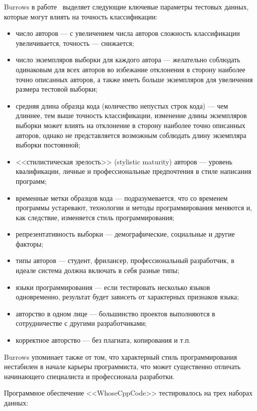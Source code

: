 Burrows в работе~\cite{burrows_big} выделяет следующие ключевые параметры тестовых данных,
которые могут влиять на точность классификации:

\begin{itemize}
 \item число авторов --- с увеличением числа авторов сложность классификации увеличивается, 
 точность --- снижается;
 \item число экземпляров выборки для каждого автора --- желательно соблюдать одинаковым для всех авторов во 
 избежание отклонения в сторону наиболее точно описанных авторов, а также иметь больше экземпляров 
 для увеличения размера тестовой выборки; 
 \item средняя длина образца кода (количество непустых строк кода) --- чем длиннее, тем выше точность
 классификации, изменение длины экземпляров выборки может влиять на отклонение в сторону наиболее 
 точно описанных авторов, однако не представляется возможным соблюдать длину экземпляра выборки постоянной;
 \item <<стилистическая зрелость>> (stylistic maturity) авторов --- уровень квалификации, 
 личные и профессиональные предпочтения в стиле написания программ;
 \item временные метки образцов кода --- подразумевается, что со временем программы устаревают, технологии
 и методы программирования меняются и, как следствие, изменяется стиль программирования;
 \item репрезентативность выборки --- демографические, социальные и другие факторы;
 \item типы авторов --- студент, фрилансер, профессиональный разработчик, 
 в идеале система должна включать в себя разные типы;
 \item языки программирования --- если тестировать несколько языков одновременно, 
 результат будет зависеть от характерных признаков языка;
 \item авторство в одном лице --- большинство проектов выполняются в 
 сотрудничестве с другими разработчиками;
 \item корректное авторство --- без плагиата, копирования и т.п.
\end{itemize}

Burrows упоминает также от том, что характерный стиль программирования нестабилен в начале карьеры программиста,
что может существенно отличать начинающего специалиста и профессионала разработки.

Программное обеспечение <<WhoseCppCode>> тестировалось на трех наборах данных:


